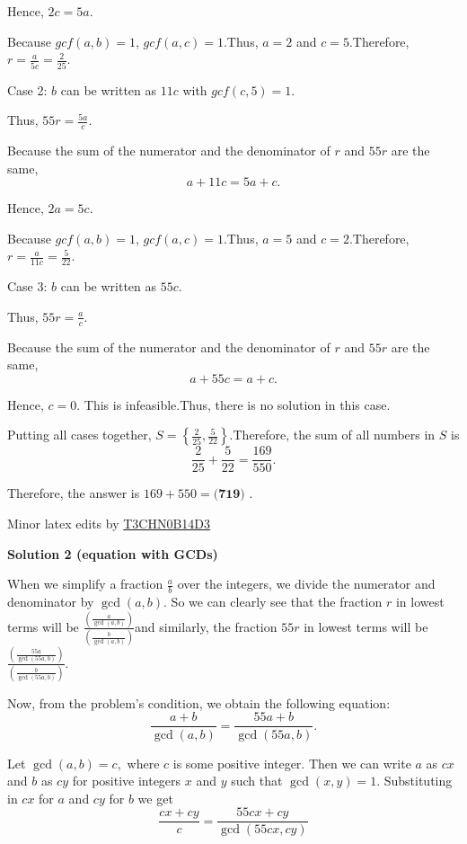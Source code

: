 \begin{enumerate}
 Hence, $2c = 5 a$.

 Because $gcf\left( a, b \right) = 1$, $gcf\left( a, c \right) = 1$.Thus, $a = 2$ and $c = 5$.Therefore, $r = \frac{a}{5c} = \frac{2}{25}$.

 Case 2: $b$ can be written as $11c$ with $gcf\left( c, 5 \right) = 1$.

 Thus, $55r = \frac{5a}{c}$.

 Because the sum of the numerator and the denominator of $r$ and $55r$ are the same,
 \[ a + 11c = 5a + c . \]

 Hence, $2a = 5 c$.

 Because $gcf\left( a, b \right) = 1$, $gcf\left( a, c \right) = 1$.Thus, $a = 5$ and $c = 2$.Therefore, $r = \frac{a}{11c} = \frac{5}{22}$.

 Case 3: $b$ can be written as $55 c$.

 Thus, $55r = \frac{a}{c}$.

 Because the sum of the numerator and the denominator of $r$ and $55r$ are the same,
 \[ a + 55c = a + c . \]

 Hence, $c = 0$. This is infeasible.Thus, there is no solution in this case.

 Putting all cases together, $S = \left\{ \frac{2}{25}, \frac{5}{22} \right\}$.Therefore, the sum of all numbers in $S$ is
 \[ \frac{2}{25} + \frac{5}{22} = \frac{169}{550} . \]

 Therefore, the answer is $169 + 550 = \boxed{\textbf{(719) }}$.

 Minor latex edits by \href{https://artofproblemsolving.com/wiki/index.php?title=User:T3chn0b14d3&action=edit&redlink=1}{T3CHN0B14D3}

 



\textbf{Solution 2 (equation with GCDs)}

When we simplify a fraction $\frac{a}{b}$ over the integers, we divide the numerator and denominator by $\gcd(a,b).$ So we can clearly see that the fraction $r$ in lowest terms will be $\frac{(\frac{a}{\gcd(a,b)})}{(\frac{b}{\gcd(a,b)})}$and similarly, the fraction $55r$ in lowest terms will be $\frac{(\frac{55a}{\gcd(55a,b)})}{(\frac{b}{\gcd(55a,b)})}.$

 Now, from the problem's condition, we obtain the following equation: 
 \[\frac{a + b}{\gcd(a,b)} = \frac{55a + b}{\gcd(55a,b)}.\]

 Let $\gcd(a,b) = c,$ where $c$ is some positive integer. Then we can write $a$ as $cx$ and $b$ as $cy$ for positive integers $x$ and $y$ such that $\gcd(x,y) = 1.$ Substituting in $cx$ for $a$ and $cy$ for $b$ we get 
 \[\frac{cx + cy}{c} = \frac{55cx + cy}{\gcd(55cx, cy)}\]


\end{enumerate}
